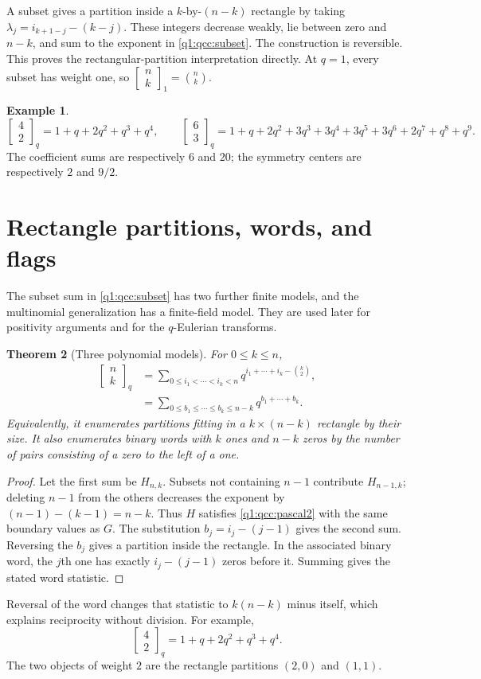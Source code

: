 \documentclass[11pt,a4paper,oneside,openany]{book}
\newtheorem{theorem}{Theorem}[chapter]
\theoremstyle{definition}
\newtheorem{example}[theorem]{Example}
\theoremstyle{remark}
\newcommand{\GB}[3][q]{\begin{bmatrix}#2\\#3\end{bmatrix}_{#1}}
\newcommand{\G}[2]{\GB{#1}{#2}}
\begin{document}
A subset gives a partition inside a \(k\)-by-\((n-k)\) rectangle by taking
\(\lambda_j=i_{k+1-j}-(k-j)\). These integers decrease weakly, lie between
zero and \(n-k\), and sum to the exponent in \eqref{q1:qcc:subset}. The construction
is reversible. This proves the rectangular-partition interpretation directly.
At \(q=1\), every subset has weight one, so \(\GB[1]nk=\binom nk\).

\begin{example}
\[
 \GB42=1+q+2q^2+q^3+q^4,\qquad
 \GB63=1+q+2q^2+3q^3+3q^4+3q^5+3q^6+2q^7+q^8+q^9.
\]
The coefficient sums are respectively \(6\) and \(20\); the symmetry centers
are respectively \(2\) and \(9/2\).
\end{example}


\section{Rectangle partitions, words, and flags}
The subset sum in \cref{q1:qcc:subset} has two further finite models, and
the multinomial generalization has a finite-field model. They are used
later for positivity arguments and for the \(q\)-Eulerian transforms.


\begin{theorem}[Three polynomial models]
\label{q3:thm:subset}
For $0\le k\le n$,
\begin{align}
 \G nk
 &=\sum_{0\le i_1<\cdots<i_k<n}
       q^{i_1+\cdots+i_k-\binom k2},
 \label{q3:eq:subset}\\
 &=\sum_{0\le b_1\le\cdots\le b_k\le n-k}q^{b_1+\cdots+b_k}.
 \label{q3:eq:rectangle}
\end{align}
Equivalently, it enumerates partitions fitting in a $k\times(n-k)$
rectangle by their size. It also enumerates binary words with $k$ ones
and $n-k$ zeros by the number of pairs consisting of a zero to the left
of a one.
\end{theorem}
\begin{proof}
Let the first sum be $H_{n,k}$. Subsets not containing $n-1$ contribute
$H_{n-1,k}$; deleting $n-1$ from the others decreases the exponent by
$(n-1)-(k-1)=n-k$. Thus $H$ satisfies \cref{q1:qcc:pascal2} with the same
boundary values as $G$. The substitution $b_j=i_j-(j-1)$ gives the second
sum. Reversing the $b_j$ gives a partition inside the rectangle.
In the associated binary word, the $j$th one has exactly
$i_j-(j-1)$ zeros before it. Summing gives the stated word statistic.
\end{proof}
Reversal of the word changes that statistic to $k(n-k)$ minus itself,
which explains reciprocity without division. For example,
\begin{equation}
 \G42=1+q+2q^2+q^3+q^4.
 \label{q3:eq:G42}
\end{equation}
The two objects of weight $2$ are the rectangle partitions $(2,0)$ and
$(1,1)$.
\end{document}
